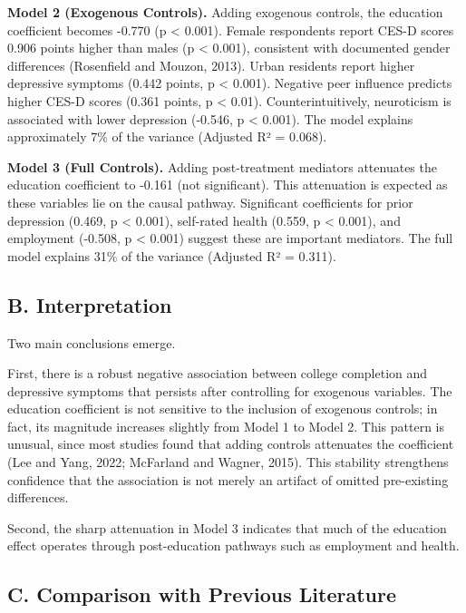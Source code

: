 \documentclass[
  12pt,
]{article}
\begin{document}
\textbf{Model 2 (Exogenous Controls).} Adding exogenous controls, the
education coefficient becomes -0.770 (p \textless{} 0.001). Female
respondents report CES-D scores 0.906 points higher than males (p
\textless{} 0.001), consistent with documented gender differences
(Rosenfield and Mouzon, 2013). Urban residents report higher depressive
symptoms (0.442 points, p \textless{} 0.001). Negative peer influence
predicts higher CES-D scores (0.361 points, p \textless{} 0.01).
Counterintuitively, neuroticism is associated with lower depression
(-0.546, p \textless{} 0.001). The model explains approximately 7\% of
the variance (Adjusted R² = 0.068).

\textbf{Model 3 (Full Controls).} Adding post-treatment mediators
attenuates the education coefficient to -0.161 (not significant). This
attenuation is expected as these variables lie on the causal pathway.
Significant coefficients for prior depression (0.469, p \textless{}
0.001), self-rated health (0.559, p \textless{} 0.001), and employment
(-0.508, p \textless{} 0.001) suggest these are important mediators. The
full model explains 31\% of the variance (Adjusted R² = 0.311).

\subsection{B. Interpretation}\label{b.-interpretation}

Two main conclusions emerge.

First, there is a robust negative association between college completion
and depressive symptoms that persists after controlling for exogenous
variables. The education coefficient is not sensitive to the inclusion
of exogenous controls; in fact, its magnitude increases slightly from
Model 1 to Model 2. This pattern is unusual, since most studies found
that adding controls attenuates the coefficient (Lee and Yang, 2022;
McFarland and Wagner, 2015). This stability strengthens confidence that
the association is not merely an artifact of omitted pre-existing
differences.

Second, the sharp attenuation in Model 3 indicates that much of the
education effect operates through post-education pathways such as
employment and health.

\subsection{C. Comparison with Previous
Literature}\label{c.-comparison-with-previous-literature}
\end{document}
